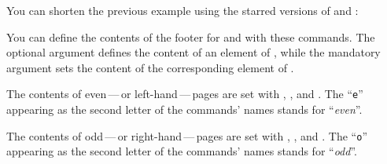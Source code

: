 \begin{Example}
  You can shorten the previous example using the starred versions of
   and :
%
\end{Example}%
\EndIndexGroup
\ExampleEndFix


\begin{Declaration}
\end{Declaration}
You can define the contents of the footer for
 and
 with these commands. The
optional argument defines the content of an element of
, while the mandatory argument
sets the content of the corresponding element of
.

The contents of even\,---\,or left-hand\,---\,pages
are set with , , and . The
``\texttt{e}'' appearing as the second letter of the commands' names stands
for ``\emph{even}''.

The contents of odd\,---\,or right-hand\,---\,pages
are set with , , and . The
``\texttt{o}'' appearing as the second letter of the commands' names stands
for ``\emph{odd}''.

